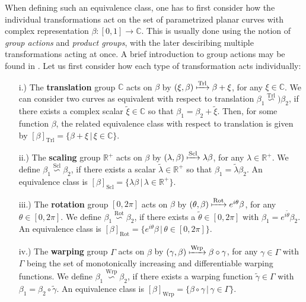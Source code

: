 When defining such an equivalence class, one has to first consider how the individual transformations act on the set of parametrized planar curves with complex representation $\beta : [0,1] \rightarrow \mathbb{C}$.
This is usually done using the notion of \textit{group actions} and \textit{product groups}, with the later desciribing multiple transformations acting at once.
A brief introduction to group actions may be found in \cite[Chap.\ 3]{SrivastavaKlassen2016}.
Let us first consider how each type of transformation acts individually:
\begin{itemize}[leftmargin=0.75cm]
  \item[i.)]
    The \textbf{translation} group $\mathbb{C}$ acts on $\beta$ by $(\xi, \beta) \xmapsto{\text{Trl}} \beta + \xi$, for any $\xi \in \mathbb{C}$.
    We can consider two curves as equivalent with respect to translation $\beta_1 \overset{\text{Trl}}{\backsim}) \beta_2$, if there exists a complex scalar $\tilde\xi \in \mathbb{C}$ so that $\beta_1 = \beta_2  + \tilde\xi$.
    Then, for some function $\beta$, the related equivalence class with respect to translation is given by $[\beta]_{\text{Trl}} = \{\beta + \xi\, |\, \xi \in \mathbb{C}\}$.
  \item[ii.)] 
    The \textbf{scaling} group $\mathbb{R}^+$ acts on $\beta$ by $(\lambda, \beta) \xmapsto{\text{Scl}} \lambda \beta$, for any $\lambda \in \mathbb{R}^+$.
    We define $\beta_1 \overset{\text{Scl}}{\backsim} \beta_2$, if there exists a scalar $\tilde\lambda \in \mathbb{R}^+$ so that $\beta_1 = \tilde\lambda \beta_2$.
    An equivalence class is $[\beta]_{\text{Scl}} = \{\lambda\beta\,|\, \lambda \in \mathbb{R}^+\}$.
  \item[iii.)] 
    The \textbf{rotation} group $[0,2\pi]$ acts on $\beta$ by $(\theta, \beta) \xmapsto{\text{Rot}}  e^{i\theta} \beta$, for any $\theta \in [0,2\pi]$.
    We define $\beta_1 \overset{\text{Rot}}{\backsim} \beta_2$, if there exists a $\tilde\theta \in [0,2\pi]$ with $\beta_1 = e^{i\tilde\theta} \beta_2$.
    An equivalence class is $[\beta]_{\text{Rot}} = \{e^{i\theta}\beta\,|\, \theta \in [0,2\pi]\}$.
  \item[iv.)] 
    The \textbf{warping} group $\Gamma$ acts on $\beta$ by $(\gamma,\beta) \xmapsto{\text{Wrp}} \beta \circ \gamma$, for any $\gamma \in \Gamma$ with $\Gamma$ being the set of monotonically increasing and differentiable warping functions.
    We define $\beta_1 \overset{\text{Wrp}}{\backsim} \beta_2$, if there exists a warping function $\tilde\gamma \in \Gamma$ with $\beta_1 = \beta_2 \circ \tilde\gamma$.
    An equivalence class is $[\beta]_{\text{Wrp}} = \{\beta \circ \gamma\,|\, \gamma \in \Gamma\}$.
\end{itemize}
